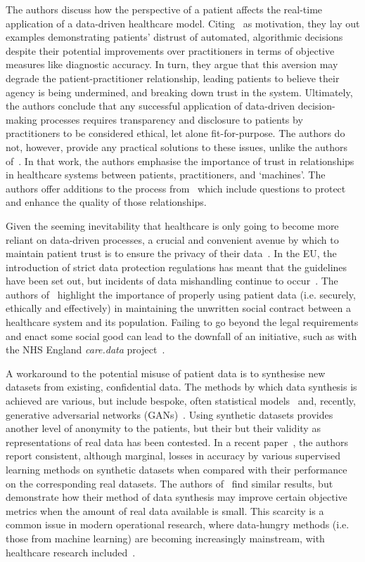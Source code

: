 The authors discuss how the perspective of a patient affects the real-time
application of a data-driven healthcare model. Citing~\cite{Dietvorst2015} as
motivation, they lay out examples demonstrating patients' distrust of automated,
algorithmic decisions despite their potential improvements over practitioners in
terms of objective measures like diagnostic accuracy. In turn, they argue that
this aversion may degrade the patient-practitioner relationship, leading
patients to believe their agency is being undermined, and breaking down trust in
the system. Ultimately, the authors conclude that any successful application of
data-driven decision-making processes requires transparency and disclosure to
patients by practitioners to be considered ethical, let alone fit-for-purpose.
The authors do not, however, provide any practical solutions to these issues,
unlike the authors of~\cite{Kraft2020}. In that work, the authors emphasise the
importance of trust in relationships in healthcare systems between patients,
practitioners, and `machines'. The authors offer additions to the process
from~\cite{Char2020} which include questions to protect and enhance the quality
of those relationships.

Given the seeming inevitability that healthcare is only going to become more
reliant on data-driven processes, a crucial and convenient avenue by which to
maintain patient trust is to ensure the privacy of their
data~\cite{Iott2019,vanStaa2016}. In the EU, the introduction of strict data
protection regulations has meant that the guidelines have been set out, but
incidents of data mishandling continue to occur~\cite{bbc2017,edpb2020}. The
authors of~\cite{Horn2020} highlight the importance of properly using patient
data (i.e. securely, ethically and effectively) in maintaining the unwritten
social contract between a healthcare system and its population. Failing to go
beyond the legal requirements and enact some social good can lead to the
downfall of an initiative, such as with the NHS England \emph{care.data}
project~\cite{Carter2015}.

A workaround to the potential misuse of patient data is to synthesise new
datasets from existing, confidential data. The methods by which data synthesis
is achieved are various, but include bespoke, often statistical
models~\cite{Dahmen2019,Dube2014,McLachlan2016,Tucker2020} and, recently,
generative adversarial networks (GANs)~\cite{Avino2018,Park2018,Torfi2020}.
Using synthetic datasets provides another level of anonymity to the patients,
but their but their validity as representations of real data has been contested.
In a recent paper~\cite{Rankin2020}, the authors report consistent, although
marginal, losses in accuracy by various supervised learning methods on synthetic
datasets when compared with their performance on the corresponding real
datasets. The authors of~\cite{Dahmen2019} find similar results, but demonstrate
how their method of data synthesis may improve certain objective metrics when
the amount of real data available is small. This scarcity is a common issue in
modern operational research, where data-hungry methods (i.e. those from machine
learning) are becoming increasingly mainstream, with healthcare research
included~\cite{Panch2019}.

